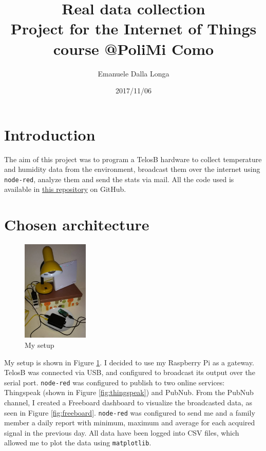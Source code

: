 \documentclass[11pt]{article}
\title{\textbf{Real data collection}\\
				\large Project for the Internet of Things course @PoliMi Como}
\author{Emanuele Dalla Longa}
\date{2017/11/06}
\begin{document}
\maketitle

\section{Introduction}
The aim of this project was to program a TelosB hardware to collect temperature and humidity data from the environment, broadcast them over the internet using \texttt{node-red}, analyze them and send the stats via mail. All the code used is available in \href{https://github.com/infinitesnow/IOT2016}{this repository} on GitHub.

\section{Chosen architecture}

\begin{figure}
\includegraphics[width=0.28\textwidth]{setup}
\caption{My setup}
\label{fig:setup}
\end{figure}

My setup is shown in Figure \ref{fig:setup}. I decided to use my Raspberry Pi as a gateway. TelosB was connected via USB, and configured to broadcast its output over the serial port. \texttt{node-red} was configured to publish to two online services: Thingspeak (shown in Figure \ref{fig:thingspeak}) and PubNub. From the PubNub channel, I created a Freeboard dashboard to visualize the broadcasted data, as seen in Figure \ref{fig:freeboard}. \texttt{node-red} was configured to send me and a family member a daily report with minimum, maximum and average for each acquired signal in the previous day. All data have been logged into CSV files, which allowed me to plot the data using \texttt{matplotlib}.
\end{document}
